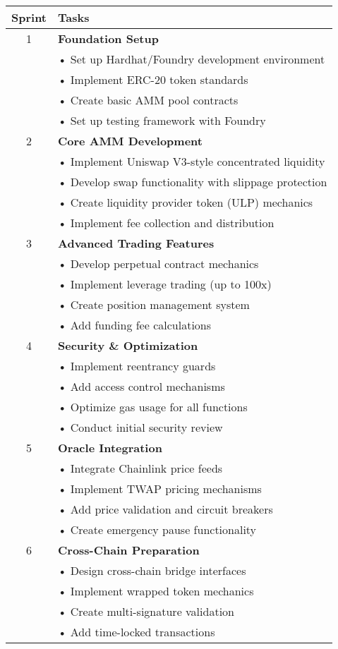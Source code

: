 \documentclass{article}
\begin{document}
\begin{longtable}{|c|p{}|}
\hline
\textbf{Sprint} & \textbf{Tasks} \\
\hline
1 & \textbf{Foundation Setup}\\
& • Set up Hardhat/Foundry development environment\\
& • Implement ERC-20 token standards\\
& • Create basic AMM pool contracts\\
& • Set up testing framework with Foundry\\
\hline
2 & \textbf{Core AMM Development}\\
& • Implement Uniswap V3-style concentrated liquidity\\
& • Develop swap functionality with slippage protection\\
& • Create liquidity provider token (ULP) mechanics\\
& • Implement fee collection and distribution\\
\hline
3 & \textbf{Advanced Trading Features}\\
& • Develop perpetual contract mechanics\\
& • Implement leverage trading (up to 100x)\\
& • Create position management system\\
& • Add funding fee calculations\\
\hline
4 & \textbf{Security \& Optimization}\\
& • Implement reentrancy guards\\
& • Add access control mechanisms\\
& • Optimize gas usage for all functions\\
& • Conduct initial security review\\
\hline
5 & \textbf{Oracle Integration}\\
& • Integrate Chainlink price feeds\\
& • Implement TWAP pricing mechanisms\\
& • Add price validation and circuit breakers\\
& • Create emergency pause functionality\\
\hline
6 & \textbf{Cross-Chain Preparation}\\
& • Design cross-chain bridge interfaces\\
& • Implement wrapped token mechanics\\
& • Create multi-signature validation\\
& • Add time-locked transactions\\

\end{longtable}
\end{document}
